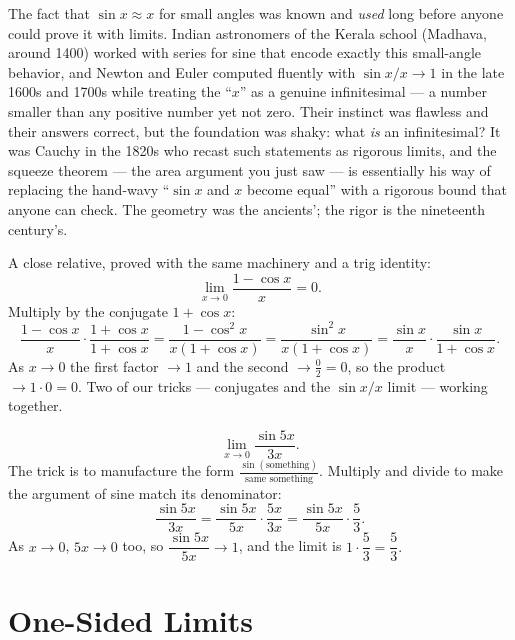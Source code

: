 \begin{historybox}
The fact that $\sin x \approx x$ for small angles was known and \emph{used}
long before anyone could prove it with limits. Indian astronomers of the
Kerala school (Madhava, around 1400) worked with series for sine that encode
exactly this small-angle behavior, and Newton and Euler computed fluently with
$\sin x / x \to 1$ in the late 1600s and 1700s while treating the ``$x$'' as a
genuine infinitesimal --- a number smaller than any positive number yet not
zero. Their instinct was flawless and their answers correct, but the
foundation was shaky: what \emph{is} an infinitesimal? It was Cauchy in the
1820s who recast such statements as rigorous limits, and the squeeze theorem ---
the area argument you just saw --- is essentially his way of replacing the
hand-wavy ``$\sin x$ and $x$ become equal'' with a rigorous bound that anyone
can check. The geometry was the ancients'; the rigor is the nineteenth
century's.
\end{historybox}

\begin{example}
\label{ch07:ex-cos}
A close relative, proved with the same machinery and a trig identity:
\[
  \lim_{x\to 0}\frac{1-\cos x}{x} = 0.
\]
Multiply by the conjugate $1+\cos x$:
\[
  \frac{1-\cos x}{x}\cdot\frac{1+\cos x}{1+\cos x}
  = \frac{1-\cos^{2}x}{x(1+\cos x)}
  = \frac{\sin^{2}x}{x(1+\cos x)}
  = \frac{\sin x}{x}\cdot\frac{\sin x}{1+\cos x}.
\]
As $x\to 0$ the first factor $\to 1$ and the second $\to \frac{0}{2} = 0$, so
the product $\to 1\cdot 0 = 0$. Two of our tricks --- conjugates and the
$\sin x/x$ limit --- working together.
\end{example}

\begin{example}
\label{ch07:ex-sin-build}
\[
  \lim_{x\to 0}\frac{\sin 5x}{3x}.
\]
The trick is to manufacture the form $\frac{\sin(\text{something})}{\text{same
something}}$. Multiply and divide to make the argument of sine match its
denominator:
\[
  \frac{\sin 5x}{3x}
  = \frac{\sin 5x}{5x}\cdot\frac{5x}{3x}
  = \frac{\sin 5x}{5x}\cdot\frac{5}{3}.
\]
As $x\to 0$, $5x\to 0$ too, so $\dfrac{\sin 5x}{5x}\to 1$, and the limit is
$1\cdot\dfrac53 = \dfrac53.$
\end{example}

\section{One-Sided Limits}
\label{ch07:onesided}

